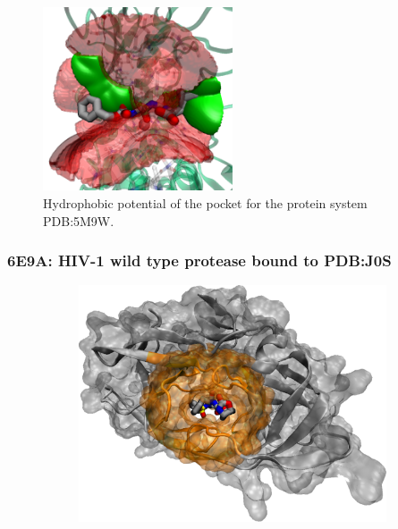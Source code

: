       \begin{figure}[H]
        \centering
        \includegraphics[width=0.5\textwidth]{figures/results/benchmark_prot/5m9w.png}
        \caption{\label{fig:benchmark/5m9w} Hydrophobic potential of the pocket for the protein system PDB:5M9W.}
      \end{figure}
    \pagebreak

    \subsubsection{6E9A: HIV-1 wild type protease bound to PDB:J0S}
      \begin{figure}[H] \centering
        \begin{subfigure}[c]{0.3\textwidth} \centering
          \includegraphics[width=1\textwidth]{figures/results/ps_prot/6e9a.png}
        \end{subfigure}
        \begin{subfigure}[c]{0.3\textwidth} \centering
        \end{subfigure}
      \end{figure}

